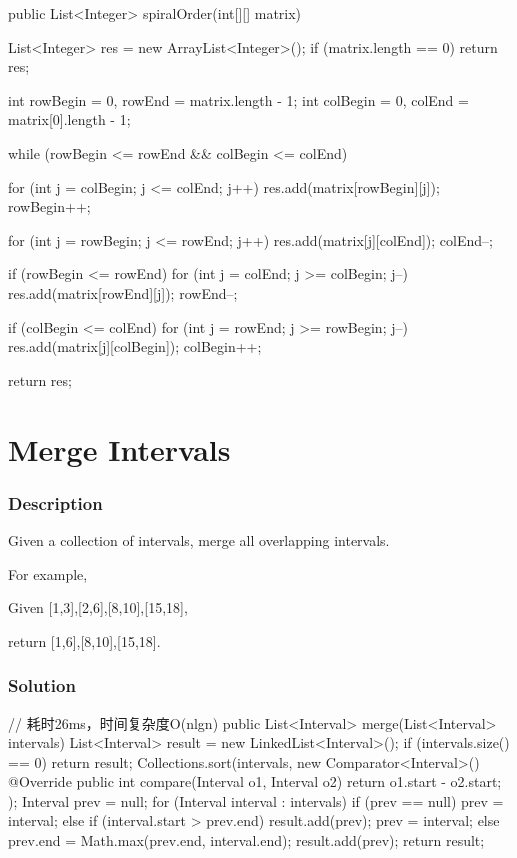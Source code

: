 \begin{Code}
public List<Integer> spiralOrder(int[][] matrix) {
    List<Integer> res = new ArrayList<Integer>();
    if (matrix.length == 0) { return res; }

    int rowBegin = 0, rowEnd = matrix.length - 1;
    int colBegin = 0, colEnd = matrix[0].length - 1;

    while (rowBegin <= rowEnd && colBegin <= colEnd) {
        for (int j = colBegin; j <= colEnd; j++) {
            res.add(matrix[rowBegin][j]);
        }
        rowBegin++;

        for (int j = rowBegin; j <= rowEnd; j++) {
            res.add(matrix[j][colEnd]);
        }
        colEnd--;

        if (rowBegin <= rowEnd) {
            for (int j = colEnd; j >= colBegin; j--) {
                res.add(matrix[rowEnd][j]);
            }
        }
        rowEnd--;

        if (colBegin <= colEnd) {
            for (int j = rowEnd; j >= rowBegin; j--) {
                res.add(matrix[j][colBegin]);
            }
        }
        colBegin++;
    }

    return res;
}
\end{Code}

\newpage

\section{Merge Intervals} %

\subsubsection{Description}
Given a collection of intervals, merge all overlapping intervals.

For example,

Given [1,3],[2,6],[8,10],[15,18],

return [1,6],[8,10],[15,18].

\subsubsection{Solution}

\begin{Code}
// 耗时26ms，时间复杂度O(nlgn)
public List<Interval> merge(List<Interval> intervals) {
    List<Interval> result = new LinkedList<Interval>();
    if (intervals.size() == 0) {
        return result;
    }
    Collections.sort(intervals, new Comparator<Interval>() {
        @Override
        public int compare(Interval o1, Interval o2) {
            return o1.start - o2.start;
        }
    });
    Interval prev = null;
    for (Interval interval : intervals) {
        if (prev == null) {
            prev = interval;
        } else {
            if (interval.start > prev.end) {
                result.add(prev);
                prev = interval;
            } else {
                prev.end = Math.max(prev.end, interval.end);
            }
        }
    }
    result.add(prev);
    return result;
}
\end{Code}

